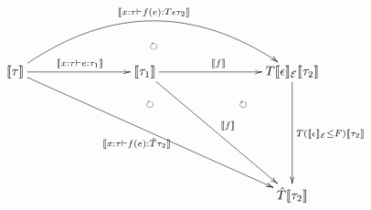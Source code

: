 \documentclass[12pt]{article}
\newcommand{\semanticf}[1]{\llbracket #1\rrbracket}
\begin{document}
\pagestyle{empty}

\begin{align*}
  \vcenter{
    \xymatrix@=80pt{
      \semanticf{\tau}
      \ar@/^40pt/@{->}[rr]^{\semanticf{x: \tau \vdash f(e): T \epsilon \tau_2}}
      \ar@/^20pt/@{{}{ }{}}[rr]|{\circlearrowright}
      \ar@{->}[r]^{\semanticf{x: \tau \vdash e: \tau_1}}
      \ar@{->}[rrd]_{\semanticf{x: \tau \vdash f(e): \hat{T} \tau_2}}
      \ar@/^20pt/@{{}{ }{}}[rrd]|(0.45){\circlearrowright}
      &
      \semanticf{\tau_1}
      \ar@{->}[r]^{\semanticf{f}}
      \ar@{->}[rd]^{\semanticf{f}}
      \ar@/^30pt/@{{}{ }{}}[rd]|{\circlearrowright}
      &
      T \semanticf{\epsilon}_{\mathcal{E}} \semanticf{\tau_2}
      \ar@{->}[d]^{T (\semanticf{\epsilon}_{\mathcal{E}} \leq F) \semanticf{\tau_2}}
      \\
      &
      &
      \hat{T} \semanticf{\tau_2}
    }
  }
\end{align*}
\end{document}

